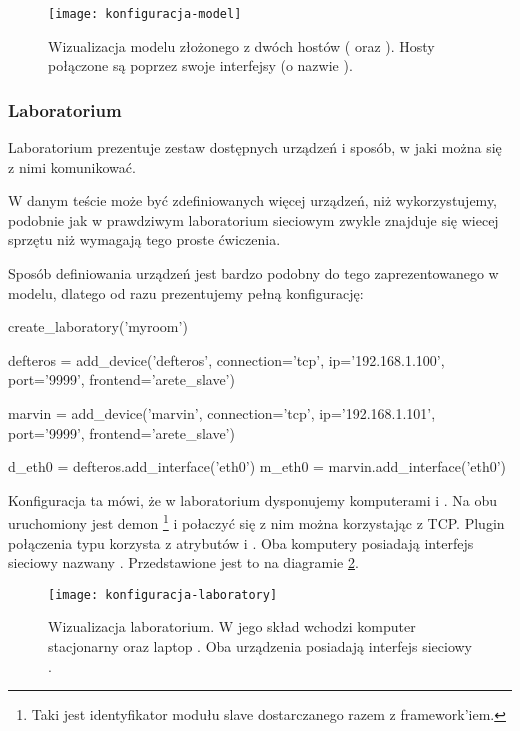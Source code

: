 \documentclass[00-praca-magisterska.tex]{subfiles}
\begin{document}
\begin{figure}[htb]
\begin{center}
\leavevmode
\texttt{[image: konfiguracja-model]}
\end{center}
\caption{Wizualizacja modelu złożonego z dwóch hostów ( oraz
). Hosty połączone są poprzez swoje interfejsy (o nazwie ).}
\label{fig:konfiguracja-model}
\end{figure}

\subsubsection{Laboratorium}

Laboratorium prezentuje zestaw dostępnych urządzeń i sposób, w jaki można się
z nimi komunikować.

W danym teście może być zdefiniowanych więcej urządzeń, niż wykorzystujemy, podobnie
jak w prawdziwym laboratorium sieciowym zwykle znajduje się wiecej sprzętu niż
wymagają tego proste ćwiczenia.

Sposób definiowania urządzeń jest bardzo podobny do tego zaprezentowanego w
modelu, dlatego od razu prezentujemy pełną konfigurację:

\begin{pythoncode}
  create_laboratory('myroom')

  defteros = add_device('defteros',
      connection='tcp',
      ip='192.168.1.100',
      port='9999',
      frontend='arete_slave')

  marvin = add_device('marvin',
      connection='tcp',
      ip='192.168.1.101',
      port='9999',
      frontend='arete_slave')

  d_eth0 = defteros.add_interface('eth0')
  m_eth0 = marvin.add_interface('eth0')
\end{pythoncode}

Konfiguracja ta mówi, że w laboratorium  dysponujemy komputerami
 i . Na obu uruchomiony jest demon
\footnote{Taki jest identyfikator modułu slave dostarczanego
razem z framework'iem.} i połaczyć się z nim można korzystając z TCP. Plugin
połączenia typu  korzysta z atrybutów  i . Oba
komputery posiadają interfejs sieciowy nazwany . Przedstawione jest
to na diagramie \ref{fig:konfiguracja-laboratory}.

\begin{figure}[htb]
\begin{center}
\leavevmode
\texttt{[image: konfiguracja-laboratory]}
\end{center}
\caption{Wizualizacja laboratorium. W jego skład wchodzi komputer stacjonarny
 oraz laptop . Oba urządzenia posiadają interfejs
sieciowy .}
\label{fig:konfiguracja-laboratory}
\end{figure}
\end{document}
